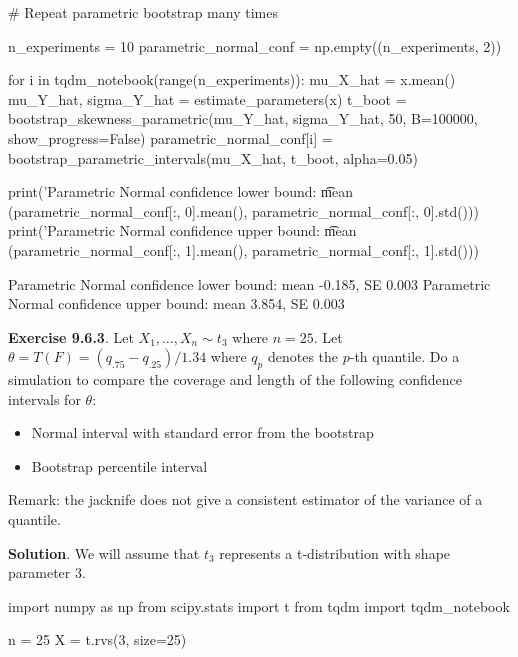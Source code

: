 \begin{python}
# Repeat parametric bootstrap many times

n_experiments = 10
parametric_{n}ormal_conf = np.empty((n_experiments, 2))

for i in tqdm_{n}otebook(range(n_experiments)):
    mu_X_hat = x.mean()
    mu_Y_hat, sigma_Y_hat = estimate_parameters(x)
    t_boot = bootstrap_skewness_parametric(mu_Y_hat, sigma_Y_hat, 50, B=100000, 
                                                                      show_progress=False)
    parametric_{n}ormal_conf[i] = bootstrap_parametric_{i}ntervals(mu_X_hat, t_boot, alpha=0.05)
\end{python}

\begin{python}
print('Parametric Normal confidence lower bound: \t mean %
      (parametric_{n}ormal_conf[:, 0].mean(), parametric_{n}ormal_conf[:, 0].std()))
print('Parametric Normal confidence upper bound: \t mean %
      (parametric_{n}ormal_conf[:, 1].mean(), parametric_{n}ormal_conf[:, 1].std()))
\end{python}

\begin{console}
Parametric Normal confidence lower bound:        mean -0.185, SE 0.003
Parametric Normal confidence upper bound:        mean 3.854, SE 0.003
\end{console}

\textbf{Exercise 9.6.3}. Let \(X_{1}, \dots, X_{n} \sim t_{3}\) where
\(n = 25\). Let \(\theta = T(F) = (q_{.75} - q_{.25})/1.34\) where
\(q_p\) denotes the \(p\)-th quantile. Do a simulation to compare the
coverage and length of the following confidence intervals for
\(\theta\):

\begin{itemize}[tightlist]
\item
  Normal interval with standard error from the bootstrap
\item
  Bootstrap percentile interval
\end{itemize}

Remark: the jacknife does not give a consistent estimator of the
variance of a quantile.

\textbf{Solution}. We will assume that \(t_{3}\) represents a
t-distribution with shape parameter 3.

\begin{python}
import numpy as np
from scipy.stats import t
from tqdm import tqdm_{n}otebook

n = 25
X = t.rvs(3, size=25)
\end{python}

